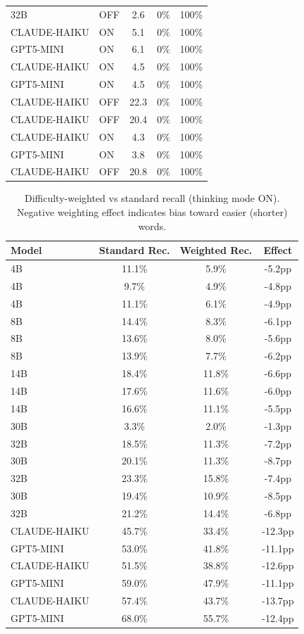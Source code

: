 \begin{table}[t]
\begin{tabular}{llccc}
32B & OFF & 2.6 & 0\% & 100\% \\
CLAUDE-HAIKU & ON  & 5.1 & 0\% & 100\% \\
GPT5-MINI & ON  & 6.1 & 0\% & 100\% \\
CLAUDE-HAIKU & ON  & 4.5 & 0\% & 100\% \\
GPT5-MINI & ON  & 4.5 & 0\% & 100\% \\
CLAUDE-HAIKU & OFF & 22.3 & 0\% & 100\% \\
CLAUDE-HAIKU & OFF & 20.4 & 0\% & 100\% \\
CLAUDE-HAIKU & ON  & 4.3 & 0\% & 100\% \\
GPT5-MINI & ON  & 3.8 & 0\% & 100\% \\
CLAUDE-HAIKU & OFF & 20.8 & 0\% & 100\% \\
\bottomrule
\end{tabular}
\end{table}




\begin{table}[t]
\centering
\small
\caption{Difficulty-weighted vs standard recall (thinking mode ON). Negative weighting effect indicates bias toward easier (shorter) words.}
\label{tab:weighted_recall}
\begin{tabular}{lccc}
\toprule
\textbf{Model} & \textbf{Standard Rec.} & \textbf{Weighted Rec.} & \textbf{Effect} \\
\midrule
4B  & 11.1\% & 5.9\% & -5.2pp \\
4B  & 9.7\% & 4.9\% & -4.8pp \\
4B  & 11.1\% & 6.1\% & -4.9pp \\
8B  & 14.4\% & 8.3\% & -6.1pp \\
8B  & 13.6\% & 8.0\% & -5.6pp \\
8B  & 13.9\% & 7.7\% & -6.2pp \\
14B & 18.4\% & 11.8\% & -6.6pp \\
14B & 17.6\% & 11.6\% & -6.0pp \\
14B & 16.6\% & 11.1\% & -5.5pp \\
30B & 3.3\% & 2.0\% & -1.3pp \\
32B & 18.5\% & 11.3\% & -7.2pp \\
30B & 20.1\% & 11.3\% & -8.7pp \\
32B & 23.3\% & 15.8\% & -7.4pp \\
30B & 19.4\% & 10.9\% & -8.5pp \\
32B & 21.2\% & 14.4\% & -6.8pp \\
CLAUDE-HAIKU & 45.7\% & 33.4\% & -12.3pp \\
GPT5-MINI & 53.0\% & 41.8\% & -11.1pp \\
CLAUDE-HAIKU & 51.5\% & 38.8\% & -12.6pp \\
GPT5-MINI & 59.0\% & 47.9\% & -11.1pp \\
CLAUDE-HAIKU & 57.4\% & 43.7\% & -13.7pp \\
GPT5-MINI & 68.0\% & 55.7\% & -12.4pp \\
\bottomrule
\end{tabular}
\end{table}




